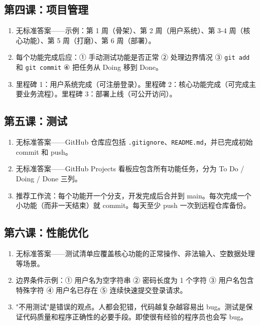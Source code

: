 \documentclass[a4paper,12pt]{ctexart}
\begin{document}
\subsection*{第四课：项目管理}
\begin{enumerate}
  \item 无标准答案——示例：第 1 周（骨架）、第 2 周（用户系统）、第 3-4 周（核心功能）、第 5 周（打磨）、第 6 周（部署）。
  \item 每个功能完成后应：① 手动测试功能是否正常 ② 处理边界情况 ③ \texttt{git add} 和 \texttt{git commit} ④ 把任务从 Doing 移到 Done。
  \item 里程碑 1：用户系统完成（可注册登录）。里程碑 2：核心功能完成（可完成主要业务流程）。里程碑 3：部署上线（可公开访问）。
\end{enumerate}

\subsection*{第五课：测试}
\begin{enumerate}
  \item 无标准答案——GitHub 仓库应包括 \texttt{.gitignore}、\texttt{README.md}，并已完成初始 commit 和 push。
  \item 无标准答案——GitHub Projects 看板应包含所有功能任务，分为 To Do / Doing / Done 三列。
  \item 推荐工作流：每个功能开一个分支，开发完成后合并到 main。每次完成一个小功能（而非一天结束）就 commit。每天至少 push 一次到远程仓库备份。
\end{enumerate}

\subsection*{第六课：性能优化}
\begin{enumerate}
  \item 无标准答案——测试清单应覆盖核心功能的正常操作、非法输入、空数据处理等场景。
  \item 边界条件示例：① 用户名为空字符串 ② 密码长度为 1 个字符 ③ 用户名包含特殊字符 ④ 用户名已存在 ⑤ 连续快速提交登录请求。
  \item "不用测试"是错误的观点。人都会犯错，代码越复杂越容易出 bug。测试是保证代码质量和程序正确性的必要手段。即使很有经验的程序员也会写 bug。
\end{enumerate}
\end{document}
